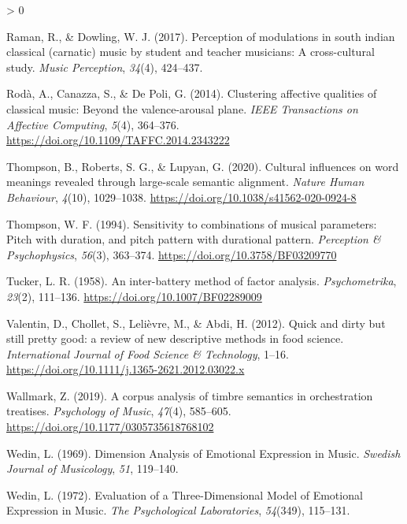 \documentclass[
  english,
  man,floatsintext]{apa6}
\newlength{\cslhangindent}
\newenvironment{CSLReferences}[2] %
 {%
  \setlength{\parindent}{0pt}
  \ifodd #1 \everypar{\setlength{\hangindent}{\cslhangindent}}\ignorespaces\fi
  \ifnum #2 > 0
  \setlength{\parskip}{#2\baselineskip}
  \fi
 }%
 {}
\begin{document}
\begin{CSLReferences}{1}{0}
\leavevmode\hypertarget{ref-Raman2017}{}%
Raman, R., \& Dowling, W. J. (2017). {Perception of modulations in south indian classical (carnatic) music by student and teacher musicians: A cross-cultural study}. \emph{Music Perception}, \emph{34}(4), 424--437.

\leavevmode\hypertarget{ref-Roda2014}{}%
Rodà, A., Canazza, S., \& De Poli, G. (2014). {Clustering affective qualities of classical music: Beyond the valence-arousal plane}. \emph{IEEE Transactions on Affective Computing}, \emph{5}(4), 364--376. \url{https://doi.org/10.1109/TAFFC.2014.2343222}

\leavevmode\hypertarget{ref-Thompson2020}{}%
Thompson, B., Roberts, S. G., \& Lupyan, G. (2020). {Cultural influences on word meanings revealed through large-scale semantic alignment}. \emph{Nature Human Behaviour}, \emph{4}(10), 1029--1038. \url{https://doi.org/10.1038/s41562-020-0924-8}

\leavevmode\hypertarget{ref-Thompson1994}{}%
Thompson, W. F. (1994). {Sensitivity to combinations of musical parameters: Pitch with duration, and pitch pattern with durational pattern}. \emph{Perception {\&} Psychophysics}, \emph{56}(3), 363--374. \url{https://doi.org/10.3758/BF03209770}

\leavevmode\hypertarget{ref-Tucker1958}{}%
Tucker, L. R. (1958). {An inter-battery method of factor analysis}. \emph{Psychometrika}, \emph{23}(2), 111--136. \url{https://doi.org/10.1007/BF02289009}

\leavevmode\hypertarget{ref-Valentin2012}{}%
Valentin, D., Chollet, S., Lelièvre, M., \& Abdi, H. (2012). {Quick and dirty but still pretty good: a review of new descriptive methods in food science}. \emph{International Journal of Food Science {\&} Technology}, 1--16. \url{https://doi.org/10.1111/j.1365-2621.2012.03022.x}

\leavevmode\hypertarget{ref-Wallmark2019}{}%
Wallmark, Z. (2019). {A corpus analysis of timbre semantics in orchestration treatises}. \emph{Psychology of Music}, \emph{47}(4), 585--605. \url{https://doi.org/10.1177/0305735618768102}

\leavevmode\hypertarget{ref-Wedin1969}{}%
Wedin, L. (1969). {Dimension Analysis of Emotional Expression in Music}. \emph{Swedish Journal of Musicology}, \emph{51}, 119--140.

\leavevmode\hypertarget{ref-Wedin1972}{}%
Wedin, L. (1972). {Evaluation of a Three-Dimensional Model of Emotional Expression in Music}. \emph{The Psychological Laboratories}, \emph{54}(349), 115--131.


\end{CSLReferences}
\end{document}
